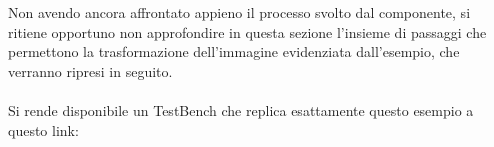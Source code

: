 \documentclass{article}
\begin{document}
\vspace{0.3cm}

\noindent Non avendo ancora affrontato appieno il processo svolto dal componente, si ritiene opportuno non approfondire in questa sezione 
l'insieme di passaggi che permettono la trasformazione dell'immagine evidenziata dall'esempio, che verranno ripresi in seguito. 
\\\\
\noindent Si rende disponibile un TestBench che replica esattamente questo esempio a questo link:\\
\end{document}
